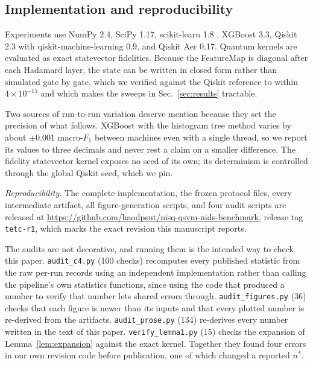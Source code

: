 \subsection{Implementation and reproducibility}
\begin{revbody}

Experiments use NumPy 2.4, SciPy 1.17, scikit-learn 1.8 \cite{ref30},
XGBoost 3.3, Qiskit 2.3 \cite{ref29} with qiskit-machine-learning 0.9, and
Qiskit Aer 0.17. Quantum
kernels are evaluated as exact statevector fidelities. Because the
\ZZ{}FeatureMap is diagonal after each Hadamard layer, the state can be written
in closed form rather than simulated gate by gate, which we verified against the
Qiskit reference to within $4\times10^{-15}$ and which makes the sweeps in
Sec.~\ref{sec:results} tractable.

Two sources of run-to-run variation deserve mention because they set the
precision of what follows. XGBoost with the histogram tree method varies by
about $\pm0.001$ macro-$F_1$ between machines even with a single thread, so we
report its values to three decimals and never rest a claim on a smaller
difference. The fidelity statevector kernel exposes no seed of its own; its
determinism is controlled through the global Qiskit seed, which we pin.

\emph{Reproducibility.} The complete implementation, the frozen protocol files,
every intermediate artifact, all figure-generation scripts, and four audit
scripts are released at
\url{https://github.com/haodpsut/nisq-qsvm-nids-benchmark}, release tag \texttt{tetc-r1}, which
marks the exact revision this manuscript reports.

The audits are not decorative, and running them is the intended way to check
this paper. \texttt{audit\_c4.py} (100 checks) recomputes every published
statistic from the raw per-run records using an independent implementation
rather than calling the pipeline's own statistics functions, since using the
code that produced a number to verify that number lets shared errors through.
\texttt{audit\_figures.py} (36) checks that each figure is newer than its inputs
and that every plotted number is re-derived from the artifacts.
\texttt{audit\_prose.py} (134) re-derives every number written in the text of
this paper. \texttt{verify\_lemma1.py} (15) checks the expansion of
Lemma~\ref{lem:expansion} against the exact kernel. Together they found four
errors in our own revision code before publication, one of which changed a
reported $n^{\ast}$.
\end{revbody}
